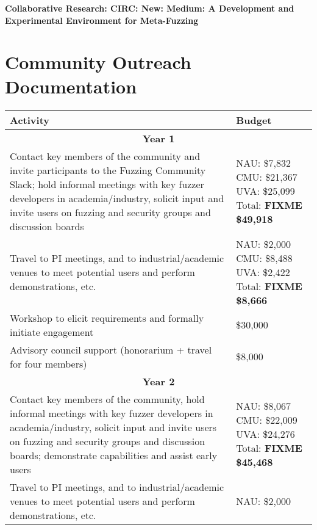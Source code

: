\documentclass[12pt]{article}
\begin{document}
\begin{center} {\Large\sf\textbf{Collaborative Research: CIRC: New: Medium: A
      Development and Experimental Environment for Meta-Fuzzing}}
\end{center}

\section*{Community Outreach Documentation}


\begin{table}
  \begin{tabular}{|p{12cm}|p{3cm}|}
    \hline
    {\bf Activity} & {\bf Budget} \\
    \hline 
    \multicolumn{2}{c}{{\bf Year 1}} \\
    \hline
    Contact key members of the community and invite participants to the
    Fuzzing Community Slack; hold informal meetings with
    key fuzzer developers in academia/industry, solicit input and
    invite users
    on fuzzing and security groups and discussion boards &  NAU: \$7,832 CMU: \$21,367 UVA: \$25,099
                                                      Total: \textbf{FIXME \$49,918} \\
    \hline
    Travel to PI meetings, and to industrial/academic venues to meet
    potential users and perform demonstrations, etc. & NAU: \$2,000
                                                       CMU: \$8,488 UVA:
                                                       \$2,422 Total: \textbf{FIXME \$8,666}\\
    \hline
    Workshop to elicit requirements and formally initiate engagement
& \$30,000 \\
    \hline 
    Advisory council support (honorarium + travel for four members) 
  & \$8,000 \\
    \hline
    \hline
    \multicolumn{2}{c}{{\bf Year 2}} \\
    \hline
    \hline
    Contact key members of the community, hold informal meetings with
    key fuzzer developers in academia/industry, solicit input and
    invite users
    on fuzzing and security groups and discussion boards; demonstrate
    capabilities and assist early users&  NAU:  \$8,067 CMU:  \$22,009 UVA: \$24,276
                                                      Total: \textbf{FIXME \$45,468}  \\
    \hline
    Travel to PI meetings, and to industrial/academic venues to meet
    potential users and perform demonstrations, etc. & NAU: \$2,000

\end{tabular}
\end{table}
\end{document}
